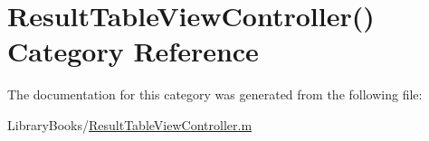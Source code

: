 \hypertarget{category_result_table_view_controller_07_08}{}\section{Result\+Table\+View\+Controller() Category Reference}
\label{category_result_table_view_controller_07_08}


The documentation for this category was generated from the following file\+:\begin{DoxyCompactItemize}
\item 
Library\+Books/\hyperlink{_result_table_view_controller_8m}{Result\+Table\+View\+Controller.\+m}\end{DoxyCompactItemize}
